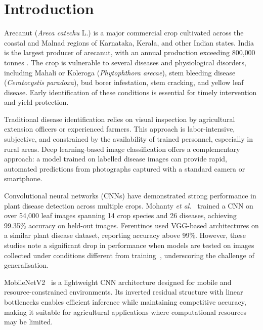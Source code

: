 \documentclass[conference]{IEEEtran}
\begin{document}
\section{Introduction}

Arecanut (\textit{Areca catechu} L.) is a major commercial crop cultivated across the coastal and Malnad regions of Karnataka, Kerala, and other Indian states. India is the largest producer of arecanut, with an annual production exceeding 800{,}000 tonnes \cite{arecanut_production}. The crop is vulnerable to several diseases and physiological disorders, including Mahali or Koleroga (\textit{Phytophthora arecae}), stem bleeding disease (\textit{Ceratocystis paradoxa}), bud borer infestation, stem cracking, and yellow leaf disease. Early identification of these conditions is essential for timely intervention and yield protection.

Traditional disease identification relies on visual inspection by agricultural extension officers or experienced farmers. This approach is labor-intensive, subjective, and constrained by the availability of trained personnel, especially in rural areas. Deep learning-based image classification offers a complementary approach: a model trained on labelled disease images can provide rapid, automated predictions from photographs captured with a standard camera or smartphone.

Convolutional neural networks (CNNs) have demonstrated strong performance in plant disease detection across multiple crops. Mohanty \textit{et al.}~\cite{mohanty2016} trained a CNN on over 54{,}000 leaf images spanning 14 crop species and 26 diseases, achieving 99.35\% accuracy on held-out images. Ferentinos \cite{ferentinos2018} used VGG-based architectures on a similar plant disease dataset, reporting accuracy above 99\%. However, these studies note a significant drop in performance when models are tested on images collected under conditions different from training~\cite{mohanty2016}, underscoring the challenge of generalisation.

MobileNetV2~\cite{sandler2018} is a lightweight CNN architecture designed for mobile and resource-constrained environments. Its inverted residual structure with linear bottlenecks enables efficient inference while maintaining competitive accuracy, making it suitable for agricultural applications where computational resources may be limited.
\end{document}
